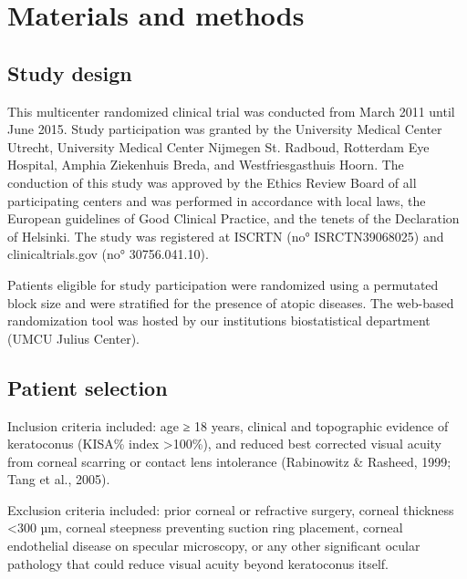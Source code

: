 \documentclass[authordate, empirical,issue]{jote-new-article}
\begin{document}
	\section{Materials and methods}



	\subsection{Study design}



	This multicenter randomized clinical trial was conducted from March 2011 until June 2015. Study participation was granted by the University Medical Center Utrecht, University Medical Center Nijmegen St. Radboud, Rotterdam Eye Hospital, Amphia Ziekenhuis Breda, and Westfriesgasthuis Hoorn. The conduction of this study was approved by the Ethics Review Board of all participating centers and was performed in accordance with local laws, the European guidelines of Good Clinical Practice, and the tenets of the Declaration of Helsinki. The study was registered at ISCRTN (no° ISRCTN39068025) and clinicaltrials.gov (no° 30756.041.10).



	Patients eligible for study participation were randomized using a permutated block size and were stratified for the presence of atopic diseases. The web-based randomization tool was hosted by our institutions biostatistical department (UMCU Julius Center).



	\subsection{Patient selection}



	Inclusion criteria included: age ≥ 18 years, clinical and topographic evidence of keratoconus (KISA\% index >100\%), and reduced best corrected visual acuity from corneal scarring or contact lens intolerance (Rabinowitz \& Rasheed, 1999; Tang et al., 2005).



	Exclusion criteria included: prior corneal or refractive surgery, corneal thickness <300 µm, corneal steepness preventing suction ring placement, corneal endothelial disease on specular microscopy, or any other significant ocular pathology that could reduce visual acuity beyond keratoconus itself.
\end{document}
